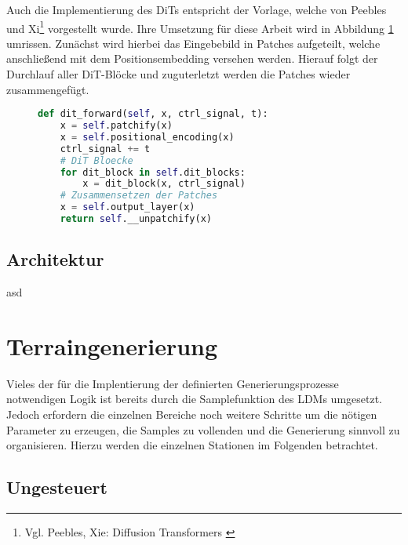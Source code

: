 Auch die Implementierung des \ac{DiT}s entspricht der Vorlage, welche von Peebles und Xi\footnote{
    Vgl. Peebles, Xie: Diffusion Transformers
    \cite{peebles2023scalable}
} vorgestellt wurde. Ihre Umsetzung für diese Arbeit wird in Abbildung \ref{fig:DiT_forward} umrissen. Zunächst wird hierbei das Eingebebild in Patches aufgeteilt, welche anschließend mit dem Positionsembedding versehen werden. Hierauf folgt der Durchlauf aller DiT-Blöcke und zuguterletzt werden die Patches wieder zusammengefügt. 
\begin{figure}[htbp]
\begin{lstlisting}[language=python]
def dit_forward(self, x, ctrl_signal, t):
    x = self.patchify(x)
    x = self.positional_encoding(x)
    ctrl_signal += t
    # DiT Bloecke
    for dit_block in self.dit_blocks:
        x = dit_block(x, ctrl_signal)
    # Zusammensetzen der Patches
    x = self.output_layer(x)
    return self.__unpatchify(x)
\end{lstlisting}
    \captionsetup{type=figure}
    \label{fig:DiT_forward}
\end{figure}

\subsection{Architektur}

asd



\section {Terraingenerierung}

Vieles der für die Implentierung der definierten Generierungsprozesse notwendigen Logik ist bereits durch die Samplefunktion des \ac{LDM}s umgesetzt. Jedoch erfordern die einzelnen Bereiche noch weitere Schritte um die nötigen Parameter zu erzeugen, die Samples zu vollenden und die Generierung sinnvoll zu organisieren. Hierzu werden die einzelnen Stationen im Folgenden betrachtet.

\subsection {Ungesteuert}

